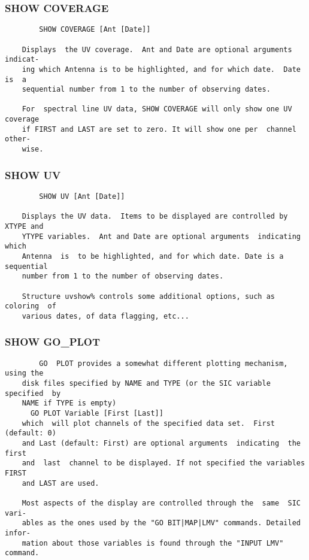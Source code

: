 \subsubsection{SHOW COVERAGE}
\begin{verbatim}
        SHOW COVERAGE [Ant [Date]]

    Displays  the UV coverage.  Ant and Date are optional arguments indicat-
    ing which Antenna is to be highlighted, and for which date.  Date  is  a
    sequential number from 1 to the number of observing dates.

    For  spectral line UV data, SHOW COVERAGE will only show one UV coverage
    if FIRST and LAST are set to zero. It will show one per  channel  other-
    wise.

\end{verbatim}
\subsubsection{SHOW UV}
\begin{verbatim}
        SHOW UV [Ant [Date]]

    Displays the UV data.  Items to be displayed are controlled by XTYPE and
    YTYPE variables.  Ant and Date are optional arguments  indicating  which
    Antenna  is  to be highlighted, and for which date. Date is a sequential
    number from 1 to the number of observing dates.

    Structure uvshow% controls some additional options, such as coloring  of
    various dates, of data flagging, etc...

\end{verbatim}
\subsubsection{SHOW GO\_PLOT}
\begin{verbatim}
        GO  PLOT provides a somewhat different plotting mechanism, using the
    disk files specified by NAME and TYPE (or the SIC variable specified  by
    NAME if TYPE is empty)
      GO PLOT Variable [First [Last]]
    which  will plot channels of the specified data set.  First (default: 0)
    and Last (default: First) are optional arguments  indicating  the  first
    and  last  channel to be displayed. If not specified the variables FIRST
    and LAST are used.

    Most aspects of the display are controlled through the  same  SIC  vari-
    ables as the ones used by the "GO BIT|MAP|LMV" commands. Detailed infor-
    mation about those variables is found through the "INPUT LMV" command.

\end{verbatim}

